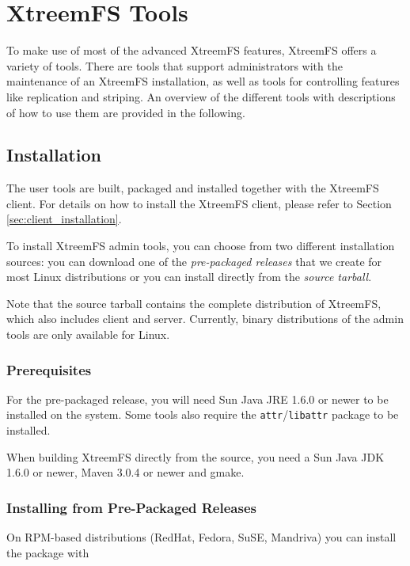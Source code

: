 \documentclass[a4paper,10pt]{book}
\begin{document}
\chapter{XtreemFS Tools}

To make use of most of the advanced XtreemFS features, XtreemFS offers a variety of tools. There are tools that support administrators with the maintenance of an XtreemFS installation, as well as tools for controlling features like replication and striping. An overview of the different tools with descriptions of how to use them are provided in the following.

\section{Installation}

The user tools are built, packaged and installed together with the XtreemFS client. For details on how to install the XtreemFS client, please refer to Section \ref{sec:client_installation}.

To install XtreemFS admin tools, you can choose from two different installation sources: you can download one of the \emph{pre-packaged releases} that we create for most Linux distributions or you can install directly from the \emph{source tarball}.

Note that the source tarball contains the complete distribution of XtreemFS, which also includes client and server. Currently, binary distributions of the admin tools are only available for Linux.

\subsection{Prerequisites}

For the pre-packaged release, you will need Sun Java JRE 1.6.0 or newer to be installed on the system. Some tools also require the \texttt{attr}/\texttt{libattr} package to be installed.

When building XtreemFS directly from the source, you need a Sun Java JDK 1.6.0 or newer, Maven 3.0.4 or newer and gmake.

\subsection{Installing from Pre-Packaged Releases}

On RPM-based distributions (RedHat, Fedora, SuSE, Mandriva) you can install the package with
\end{document}
